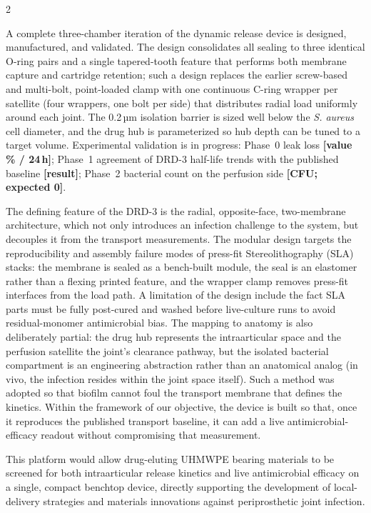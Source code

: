 \documentclass[8pt]{extarticle}
\newcommand{\tbd}[1]{{\color{tbdcol}\textbf{[#1]}}}
\newcommand{\osec}[1]{\par\vspace{0.5pt}\noindent{\bfseries\color{tealc}#1.}\hspace{0.6em}\ignorespaces}
\begin{document}
\begin{multicols}{2}
\osec{Results}
A complete three-chamber iteration of the dynamic release device is designed, manufactured, and validated. The design consolidates all sealing to three
identical O-ring pairs and a single tapered-tooth feature that performs both membrane capture and
cartridge retention; such a design replaces the earlier screw-based and multi-bolt, point-loaded clamp with one continuous
C-ring wrapper per satellite (four wrappers, one bolt per side) that distributes radial load uniformly
around each joint. The 0.2\,µm isolation barrier is sized well below the \emph{S. aureus} cell
diameter, and the drug hub is parameterized so hub depth can be tuned to a target volume. Experimental validation is in progress: Phase~0 leak loss
\tbd{value \% / 24\,h}; Phase~1 agreement of DRD-3 half-life trends with the published baseline
\tbd{result}; Phase~2 bacterial count on the perfusion side \tbd{CFU; expected 0}.

\osec{Discussion}
The defining feature of the DRD-3 is the radial, opposite-face, two-membrane architecture, which not only introduces an infection challenge to the system, but decouples it from the transport measurements. 
The modular design targets the reproducibility and assembly
failure modes of press-fit Stereolithography (SLA) stacks: the membrane is sealed as a bench-built module, the seal is an
elastomer rather than a flexing printed feature, and the wrapper clamp removes press-fit interfaces
from the load path. A limitation of the design include the fact SLA parts must be fully post-cured and washed before live-culture runs to avoid residual-monomer antimicrobial bias. The mapping to anatomy is also deliberately partial: the drug hub
represents the intraarticular space and the perfusion satellite the joint's clearance pathway, but the
isolated bacterial compartment is an engineering abstraction rather than an anatomical analog (in vivo,
the infection resides within the joint space itself). Such a method was adopted so that biofilm cannot foul the
transport membrane that defines the kinetics. Within the framework of our objective, the device is built so that,
once it reproduces the published transport baseline, it can add a live antimicrobial-efficacy readout
without compromising that measurement.

\osec{Significance}
This platform would allow drug-eluting UHMWPE bearing materials to be screened for both intraarticular
release kinetics and live antimicrobial efficacy on a single, compact benchtop device, directly supporting the
development of local-delivery strategies and materials innovations against periprosthetic joint infection.


\end{multicols}
\end{document}
